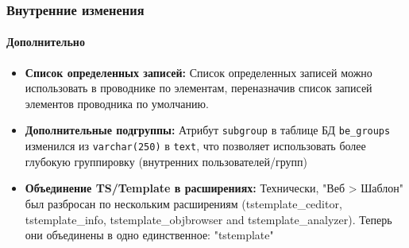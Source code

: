 \begin{frame}[fragile]
	\frametitle{Внутренние изменения}
	\framesubtitle{Дополнительно}

	\begin{itemize}

		\item \textbf{Список определенных записей:}\newline
			\small
				Список определенных записей можно использовать в проводнике по элементам,
				переназначив список записей элементов проводника по умолчанию.
			\normalsize

		\item \textbf{Дополнительные подгруппы:}\newline
			\small
				Атрибут \texttt{subgroup} в таблице БД \texttt{be\_groups} изменился из \texttt{varchar(250)} в \texttt{text}, что позволяет использовать более глубокую группировку (внутренних пользователей/групп)
			\normalsize

		\item \textbf{Объединение TS/Template в расширениях:}\newline
			\small
				Технически, "Веб > Шаблон" был разбросан по нескольким расширениям (tstemplate\_ceditor, tstemplate\_info,
tstemplate\_objbrowser and tstemplate\_analyzer). Теперь они объединены в одно единственное: "tstemplate"
			\normalsize

	\end{itemize}
	
\end{frame}


